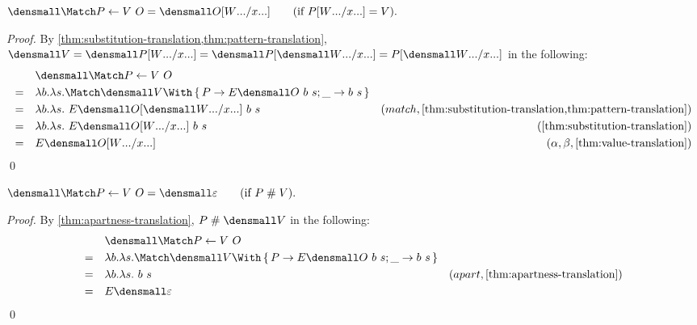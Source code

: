 \begin{lemma}
  \label{thm:try-match}

  $\den{\Match P \gets V ~ O} = \den{O\subst{\many{x}}{\many{W}}}
  \qquad (\text{if } P\subst{\many{x}}{\many{W}} = V).$
\end{lemma}
\begin{proof}
  By \cref{thm:substitution-translation,thm:pattern-translation},
  \begin{math}
    \den{V}
    =
    \den{P\subst{\many{x}}{\many{W}}}
    =
    \den{P}\subst{\many{x}}{\many{\den{W}}}
    =
    P\subst{\many{x}}{\many{\den{W}}}
  \end{math}
  in the following:
  \begin{align*}
    &\quad \den{\Match P \gets V ~ O}  \\
    =&\quad \lambda b. \lambda s. \Match \den{V} \With \set{P \to E\den{O}~b~s; \_ \to b~s} \\
    =&\quad  \lambda b. \lambda s.~E\den{O}\subst{\many{x}}{\many{\den{W}}}~b~s  & (match, \cref{thm:substitution-translation,thm:pattern-translation}) \\
    =& \quad \lambda b. \lambda s.~E\den{O\subst{\many{x}}{\many{W}}}~b~s & (\cref{thm:substitution-translation})
    \\
    =& \quad E\den{O\subst{\many{x}}{\many{W}}} & (\alpha, \beta, \cref{thm:value-translation})
  \end{align*}
  \qed
\end{proof}

\begin{lemma}
  \label{thm:try-match-apart}

  $\den{\Match P \gets V ~ O} = \den{\varepsilon}
  \qquad (\text{if } P \apart V).$
\end{lemma}
\begin{proof}
  By \cref{thm:apartness-translation}, $P \apart \den{V}$ in the following:
  \begin{align*}
    &\quad \den{\Match P \gets V ~ O}  \\
    =&\quad \lambda b. \lambda s. \Match \den{V} \With \set{P \to E\den{O}~b~s; \_ \to b~s} \\
    =&\quad  \lambda b. \lambda s.~b~s  & (apart, \cref{thm:apartness-translation}) \\
    =& \quad E\den{\varepsilon}
  \end{align*}
  \qed
\end{proof}

